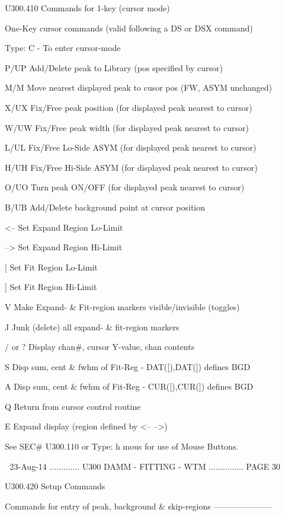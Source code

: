    U300.410  Commands for 1-key (cursor mode)
 
   One-Key cursor commands (valid following a DS or DSX command)
 
   Type: C  - To enter cursor-mode
 
   P/UP   Add/Delete peak to Library (pos specified by cursor)
 
   M/M    Move nearest displayed peak to cusor pos (FW, ASYM unchanged)
 
   X/UX   Fix/Free  peak position (for displayed peak nearest to cursor)
 
   W/UW   Fix/Free  peak width    (for displayed peak nearest to cursor)
 
   L/UL   Fix/Free  Lo-Side ASYM  (for displayed peak nearest to cursor)
 
   H/UH   Fix/Free  Hi-Side ASYM  (for displayed peak nearest to cursor)
 
   O/UO   Turn peak  ON/OFF       (for displayed peak nearest to cursor)
 
   B/UB   Add/Delete background point at cursor position
 
   <--    Set Expand Region   Lo-Limit
 
   -->    Set Expand Region   Hi-Limit
 
   [      Set Fit Region      Lo-Limit
 
   ]      Set Fit Region      Hi-Limit
 
   V      Make Expand- & Fit-region markers visible/invisible (toggles)
 
   J      Junk (delete) all expand- & fit-region markers
 
   / or ? Display chan#, cursor Y-value, chan contents
 
   S      Disp sum, cent & fwhm of Fit-Reg - DAT([),DAT(]) defines BGD
 
   A      Disp sum, cent & fwhm of Fit-Reg - CUR([),CUR(]) defines BGD
 
   Q      Return from cursor control routine
 
   E      Expand display (region defined by <--  -->)
 
 
 
   See SEC# U300.110 or Type: h mous for use of Mouse Buttons.
 
    
   23-Aug-14 ............. U300  DAMM - FITTING - WTM ............... PAGE  30
 
   U300.420  Setup Commands
 
   Commands for entry of peak, background & skip-regions ---------------------
 
